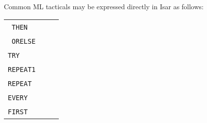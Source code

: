 \begin{isabellebody}
\begin{isamarkuptext}
  \medskip Common ML tacticals may be expressed directly in Isar as
  follows:

  \medskip
  \begin{tabular}{lll}
    \isa{{\isaliteral{22}{\isachardoublequote}}tac\isaliteral{5C3C5E7375623E}{}\isactrlsub {\isadigit{1}}{\isaliteral{22}{\isachardoublequote}}}~\verb|THEN|~\isa{{\isaliteral{22}{\isachardoublequote}}tac\isaliteral{5C3C5E7375623E}{}\isactrlsub {\isadigit{2}}{\isaliteral{22}{\isachardoublequote}}} & & \isa{{\isaliteral{22}{\isachardoublequote}}meth\isaliteral{5C3C5E7375623E}{}\isactrlsub {\isadigit{1}}{\isaliteral{2C}{\isacharcomma}}\ meth\isaliteral{5C3C5E7375623E}{}\isactrlsub {\isadigit{2}}{\isaliteral{22}{\isachardoublequote}}} \\
    \isa{{\isaliteral{22}{\isachardoublequote}}tac\isaliteral{5C3C5E7375623E}{}\isactrlsub {\isadigit{1}}{\isaliteral{22}{\isachardoublequote}}}~\verb|ORELSE|~\isa{{\isaliteral{22}{\isachardoublequote}}tac\isaliteral{5C3C5E7375623E}{}\isactrlsub {\isadigit{2}}{\isaliteral{22}{\isachardoublequote}}} & & \isa{{\isaliteral{22}{\isachardoublequote}}meth\isaliteral{5C3C5E7375623E}{}\isactrlsub {\isadigit{1}}\ {\isaliteral{7C}{\isacharbar}}\ meth\isaliteral{5C3C5E7375623E}{}\isactrlsub {\isadigit{2}}{\isaliteral{22}{\isachardoublequote}}} \\
    \verb|TRY|~\isa{tac} & & \isa{{\isaliteral{22}{\isachardoublequote}}meth{\isaliteral{3F}{\isacharquery}}{\isaliteral{22}{\isachardoublequote}}} \\
    \verb|REPEAT1|~\isa{tac} & & \isa{{\isaliteral{22}{\isachardoublequote}}meth{\isaliteral{2B}{\isacharplus}}{\isaliteral{22}{\isachardoublequote}}} \\
    \verb|REPEAT|~\isa{tac} & & \isa{{\isaliteral{22}{\isachardoublequote}}{\isaliteral{28}{\isacharparenleft}}meth{\isaliteral{2B}{\isacharplus}}{\isaliteral{29}{\isacharparenright}}{\isaliteral{3F}{\isacharquery}}{\isaliteral{22}{\isachardoublequote}}} \\
    \verb|EVERY|~\isa{{\isaliteral{22}{\isachardoublequote}}{\isaliteral{5B}{\isacharbrackleft}}tac\isaliteral{5C3C5E7375623E}{}\isactrlsub {\isadigit{1}}{\isaliteral{2C}{\isacharcomma}}\ {\isaliteral{5C3C646F74733E}{\isasymdots}}{\isaliteral{5D}{\isacharbrackright}}{\isaliteral{22}{\isachardoublequote}}} & & \isa{{\isaliteral{22}{\isachardoublequote}}meth\isaliteral{5C3C5E7375623E}{}\isactrlsub {\isadigit{1}}{\isaliteral{2C}{\isacharcomma}}\ {\isaliteral{5C3C646F74733E}{\isasymdots}}{\isaliteral{22}{\isachardoublequote}}} \\
    \verb|FIRST|~\isa{{\isaliteral{22}{\isachardoublequote}}{\isaliteral{5B}{\isacharbrackleft}}tac\isaliteral{5C3C5E7375623E}{}\isactrlsub {\isadigit{1}}{\isaliteral{2C}{\isacharcomma}}\ {\isaliteral{5C3C646F74733E}{\isasymdots}}{\isaliteral{5D}{\isacharbrackright}}{\isaliteral{22}{\isachardoublequote}}} & & \isa{{\isaliteral{22}{\isachardoublequote}}meth\isaliteral{5C3C5E7375623E}{}\isactrlsub {\isadigit{1}}\ {\isaliteral{7C}{\isacharbar}}\ {\isaliteral{5C3C646F74733E}{\isasymdots}}{\isaliteral{22}{\isachardoublequote}}} \\
  \end{tabular}
  \medskip


\end{isamarkuptext}
\end{isabellebody}

